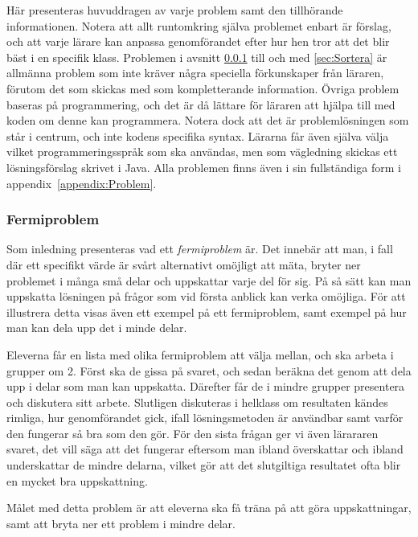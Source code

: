 \textcolor{lila}{Här presenteras huvuddragen av varje problem samt den tillhörande informationen. Notera att allt runtomkring själva problemet enbart är förslag, och att varje lärare kan anpassa genomförandet efter hur hen tror att det blir bäst i en specifik klass. Problemen i avsnitt \ref{sec:Fermi} till och med \ref{sec:Sortera} är allmänna problem som inte kräver några speciella förkunskaper från läraren, förutom det som skickas med som kompletterande information. Övriga problem baseras på programmering, och det är då lättare för läraren att hjälpa till med koden om denne kan programmera. Notera dock att det är problemlösningen som står i centrum, och inte kodens specifika syntax. Lärarna får även själva välja vilket programmeringsspråk som ska användas, men som vägledning skickas ett lösningsförslag skrivet i Java. Alla problemen finns även i sin fullständiga form i appendix~\ref{appendix:Problem}.}

\subsubsection{Fermiproblem}
    \label{sec:Fermi}
 
    \textcolor{lila}{Som inledning presenteras vad ett \textsl{fermiproblem} är. Det innebär att man, i fall där ett specifikt värde är svårt alternativt omöjligt att mäta, bryter ner problemet i många små delar och uppskattar varje del för sig. På så sätt kan man uppskatta lösningen på frågor som vid första anblick kan verka omöjliga. För att illustrera detta visas även ett exempel på ett fermiproblem, samt exempel på hur man kan dela upp det i minde delar.}

    \textcolor{lila}{Eleverna får en lista med olika fermiproblem att välja mellan, och ska arbeta i grupper om 2. Först ska de gissa på svaret, och sedan beräkna det genom att dela upp i delar som man kan uppskatta. Därefter får de i mindre grupper presentera och diskutera sitt arbete. Slutligen diskuteras i helklass om resultaten kändes rimliga, hur genomförandet gick, ifall lösningsmetoden är användbar samt varför den fungerar så bra som den gör. För den sista frågan ger vi även lärararen svaret, det vill säga att det fungerar eftersom man ibland överskattar och ibland underskattar de mindre delarna, vilket gör att det slutgiltiga resultatet ofta blir en mycket bra uppskattning.}
    
    \textcolor{lila}{Målet med detta problem är att eleverna ska få träna på att göra uppskattningar, samt att bryta ner ett problem i mindre delar.}
    
